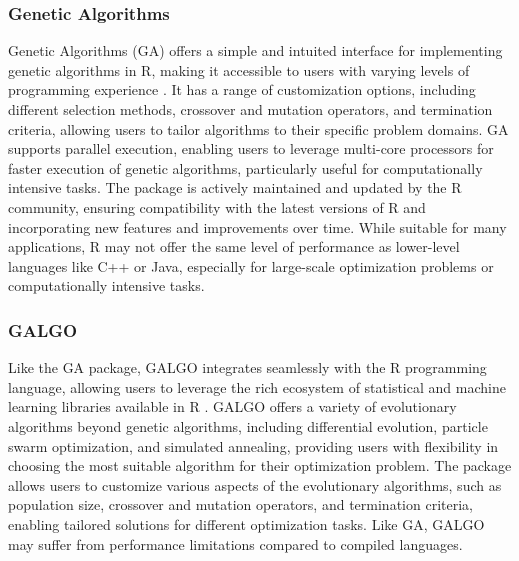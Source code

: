 \documentclass[12pt]{report}
\begin{document}
 
\subsubsection{Genetic Algorithms}
Genetic Algorithms (GA) offers a simple and intuited interface for implementing genetic algorithms in R, making it accessible to users with varying levels of programming experience \cite{GA1, GA2}. It has a range of customization options, including different selection methods, crossover and mutation operators, and termination criteria, allowing users to tailor algorithms to their specific problem domains. GA supports parallel execution, enabling users to leverage multi-core processors for faster execution of genetic algorithms, particularly useful for computationally intensive tasks. The package is actively maintained and updated by the R community, ensuring compatibility with the latest versions of R and incorporating new features and improvements over time. While suitable for many applications, R may not offer the same level of performance as lower-level languages like C++ or Java, especially for large-scale optimization problems or computationally intensive tasks.

\subsubsection{GALGO}

Like the GA package, GALGO integrates seamlessly with the R programming language, allowing users to leverage the rich ecosystem of statistical and machine learning libraries available in R \cite{Trevino2006}. GALGO offers a variety of evolutionary algorithms beyond genetic algorithms, including differential evolution, particle swarm optimization, and simulated annealing, providing users with flexibility in choosing the most suitable algorithm for their optimization problem. The package allows users to customize various aspects of the evolutionary algorithms, such as population size, crossover and mutation operators, and termination criteria, enabling tailored solutions for different optimization tasks. Like GA, GALGO may suffer from performance limitations compared to compiled languages.
\end{document}
